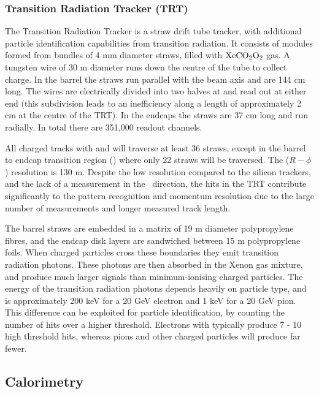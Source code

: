 \subsubsection{Transition Radiation Tracker (TRT)}
\label{sec:Detector-TRT}

The Transition Radiation Tracker is a straw drift tube tracker, with additional
particle identification capabilities from transition radiation. It consists of
modules formed from bundles of 4 mm diameter straws, filled with
$\rm{XeCO_{2}O_{2}}$ gas. A tungsten wire of 30 \micro m diameter runs down
the centre of the tube to collect charge. In the barrel the straws run parallel
with the beam axis and are 144 cm long. The wires are electrically divided into two halves at
 and read out at either end (this subdivision leads to an
inefficiency along a length of approximately 2 cm at the centre of the TRT). In
the endcaps the straws are 37 cm long and run radially. In total there are
351,000 readout channels.

All charged tracks with  and  will traverse at least 36
straws, except in the barrel to endcap transition region ()
where only 22 straws will be traversed. The ($R-\phi$) resolution is 130 \micro
m. Despite the low resolution compared to the silicon trackers, and the lack of
a measurement in the \z\ direction, the hits in the TRT contribute significantly
to the pattern recognition and momentum resolution due to the large number of
measurements and longer measured track length.

The barrel straws are embedded in a matrix of 19 \micro m diameter polypropylene
fibres, and the endcap disk layers are sandwiched between 15 \micro m
polypropylene foils. When charged particles cross these boundaries they emit
transition radiation photons. These photons are then absorbed in the Xenon gas
mixture, and produce much larger signals than minimum-ionising
charged particles. The energy of the transition radiation photons depends
heavily on particle type, and is approximately 200 keV for a 20 GeV electron and
1 keV for a 20 GeV pion. This difference can be exploited for particle
identification, by counting the number of hits over a higher threshold.
Electrons with  typically produce 7 - 10 high threshold hits, whereas
pions and other charged particles will produce far fewer.

\subsection{Calorimetry}

